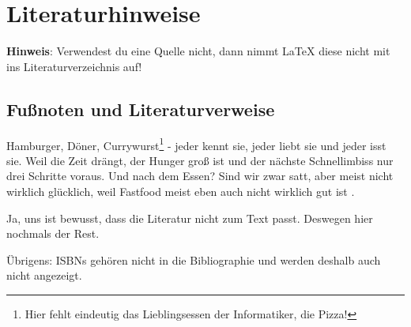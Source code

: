 \chapter{Literaturhinweise}

\textbf{Hinweis}: Verwendest du eine Quelle nicht, dann nimmt \LaTeX{} diese nicht mit ins Literaturverzeichnis auf!

\section{Fußnoten und Literaturverweise}
Hamburger, Döner, Currywurst\footnote{Hier fehlt eindeutig das Lieblingsessen der Informatiker, die Pizza!} - jeder kennt sie, jeder liebt sie und jeder isst sie.
Weil die Zeit drängt\cite{ahk:001}, der Hunger groß ist und der nächste Schnellimbiss\cite{bpb:001} nur drei Schritte voraus. Und nach dem Essen?
Sind wir zwar satt, aber meist nicht wirklich glücklich, weil Fastfood\cite{bpb:006} meist eben auch nicht wirklich gut ist \cite{bpb:005}.

Ja, uns ist bewusst, dass die Literatur nicht zum Text passt.
Deswegen hier nochmals der Rest.\cite{eur:001,EU:001,Lang1998,höl:001,wdb:001}

Übrigens: \acfp{ISBN} gehören nicht in die Bibliographie und werden deshalb auch nicht angezeigt.
